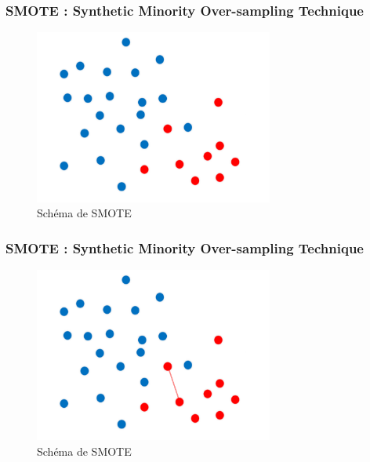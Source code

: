 \documentclass{beamer}
\begin{document}
\begin{frame}
  \frametitle{SMOTE : Synthetic Minority Over-sampling Technique}
  \begin{figure}
      \centering
      \includegraphics[width=0.7\textwidth]{images/SMOTEE.png}
      \caption{Schéma de SMOTE}
  \end{figure}

  \end{frame}

  \begin{frame}
      \frametitle{SMOTE : Synthetic Minority Over-sampling Technique}



      \begin{figure}
          \centering
          \includegraphics[width=0.7\textwidth]{images/SMOTED.png}
          \caption{Schéma de SMOTE}
      \end{figure}

  \end{frame}
\end{document}

